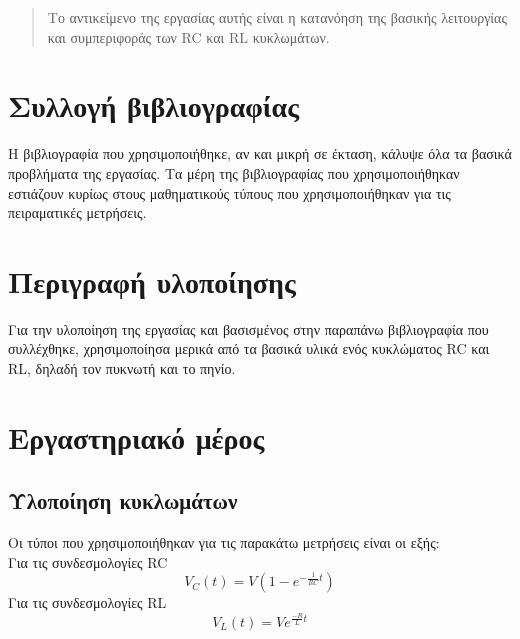 \documentclass{article}
\begin{document}
\begin{titlepage}
\maketitle
\end{titlepage}

\renewcommand{\contentsname}{Περιεχόμενα}
\tableofcontents

\renewcommand{\abstractname}{Εισαγωγή}
\begin{abstract}
	Το αντικείμενο της εργασίας αυτής είναι η κατανόηση της βασικής λειτουργίας
	και συμπεριφοράς των RC και RL κυκλωμάτων.
\end{abstract}
\pagebreak

\section{Συλλογή βιβλιογραφίας}
Η βιβλιογραφία που χρησιμοποιήθηκε, αν και μικρή σε έκταση, κάλυψε όλα τα βασικά
προβλήματα της εργασίας. Τα μέρη της βιβλιογραφίας που χρησιμοποιήθηκαν εστιάζουν
κυρίως στους μαθηματικούς τύπους που χρησιμοποιήθηκαν για τις πειραματικές μετρήσεις.

\section{Περιγραφή υλοποίησης}
Για την υλοποίηση της εργασίας και βασισμένος στην παραπάνω βιβλιογραφία που συλλέχθηκε,
χρησιμοποίησα μερικά από τα βασικά υλικά ενός κυκλώματος RC και RL, δηλαδή τον πυκνωτή
και το πηνίο.

\section{Εργαστηριακό μέρος}
\subsection{Υλοποίηση κυκλωμάτων}
Οι τύποι που χρησιμοποιήθηκαν για τις παρακάτω μετρήσεις είναι οι εξής: \\
Για τις συνδεσμολογίες RC
\[V_C(t) = V(1- e^{-\frac{1}{RC}t})\]
Για τις συνδεσμολογίες RL
\[V_L(t) = Ve^{\frac{-R}{L}t}\]
\end{document}
